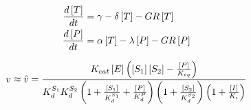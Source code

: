 \documentclass[12pt]{article}
\begin{document}
\begin{align}
\frac{d\left[T\right]}{dt} &= \gamma - \delta\left[T\right] - GR\left[T\right]\notag\\
\frac{d\left[P\right]}{dt} &= \alpha\left[T\right] - \lambda\left[P\right] - GR\left[P\right]\notag
\end{align}

\begin{equation}
v \approx \hat{v} = \frac{K_{cat}\left[E\right]\left(\left[S_{1}\right]\left[S_{2}\right] - \frac{\left[P\right]}{K_{eq}}\right)}{K^{S_{1}}_{d}K^{S_{2}}_{d}\left(1 + \frac{\left[S_{1}\right]}{K^{S_{1}}_{d}} + \frac{\left[P\right]}{K^{P}_{d}}\right)\left(1 + \frac{\left[S_{2}\right]}{K^{S_{2}}_{d}}\right)\left(1 + \frac{\left[I\right]}{K_{i}}\right)
}\notag
\end{equation}
\end{document}

